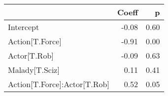 \begin{tabular}{lrr}
\toprule
{} &  Coeff &    p \\
\midrule
Intercept                    &  -0.08 & 0.60 \\
Action[T.Force]              &  -0.91 & 0.00 \\
Actor[T.Rob]                 &  -0.09 & 0.63 \\
Malady[T.Sciz]               &   0.11 & 0.41 \\
Action[T.Force]:Actor[T.Rob] &   0.52 & 0.05 \\
\bottomrule
\end{tabular}
